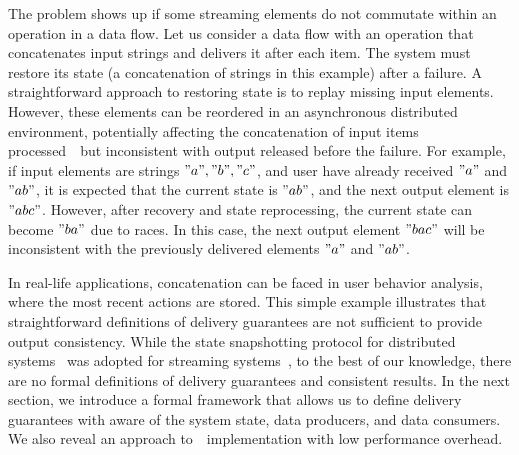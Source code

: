 The problem shows up if some streaming elements do not commutate within an operation in a data flow. 
Let us consider a data flow with an operation that concatenates input strings and delivers it after each item. 
The system must restore its state  (a concatenation of strings in this example) after a failure. 
A straightforward approach to restoring state is to replay missing input elements. 
However, these elements can be reordered in an asynchronous distributed environment, potentially affecting    the   concatenation   of input items processed~\eo\ but  inconsistent with output  released before the failure. 
For example, if input elements are strings $"a","b","c"$, and user have already received  $"a"$ and $"ab"$, it is expected that the current state is $"ab"$, and the next output element is $"abc"$. However, after recovery and state reprocessing, the current state can become $"ba"$ due to races. In this case, the next output element $"bac"$ will be inconsistent with the previously delivered elements $"a"$ and $"ab"$.  

In real-life applications, concatenation can be faced in user behavior analysis, where the most recent actions are stored. 
This simple example illustrates that straightforward definitions of delivery guarantees are not sufficient to provide output consistency. 
While the state snapshotting protocol for distributed systems~\cite{Chandy:1985:DSD:214451.214456} was adopted for streaming systems~\cite{2015arXiv150608603C}, to the best of our knowledge, there are no formal definitions of delivery guarantees and consistent results. 
In the next  section, we introduce  a formal framework that allows us to define delivery guarantees with aware of the system state, data producers, and data consumers. 
We also reveal an approach to~\eo\ implementation with low performance overhead. 


\
